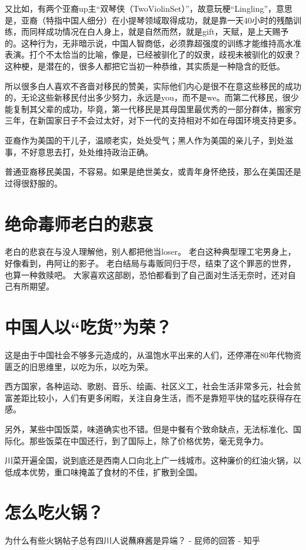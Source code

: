 \documentclass[fontset=founder]{ctexbook}
\begin{document}
又比如，有两个亚裔up主“双琴侠（TwoViolinSet）”，故意玩梗“Lingling”，意思是，亚裔（特指中国人细分）在小提琴领域取得成功，就是靠一天40小时的残酷训练，而同样成功情况在白人身上，就是自然而然，就是gift，天赋，是上天赐予的。这种行为，无非暗示说，中国人智商低，必须靠超强度的训练才能维持高水准表演。打个不太恰当的比喻，像是，已经被驯化了的奴隶，歧视未被驯化的奴隶？这种梗，是潜在的，很多人都把它当初一种恭维，其实质是一种隐含的贬低。

所以很多白人喜欢不吝啬对移民的赞美，实际他们内心是很不在意这些移民的成功的，无论这些新移民付出多少努力，永远是you，而不是we。而第二代移民，很少能复制其父辈的成功，毕竟，第一代移民是其母国里最优秀的一部分群体，搬家穷三年，在新国家日子不会过太好，对下一代的支持相对不如在母国环境支持更多。

亚裔作为美国的干儿子，温顺老实，处处受气；黑人作为美国的亲儿子，到处滋事，不好意思去打，处处维持政治正确。

普通亚裔移民美国，不容易。如果是绝世美女，或青年身怀绝技，那么在美国还是过得很舒服的。

\section{绝命毒师老白的悲哀}
老白的悲哀在与没人理解他，别人都把他当loser。
老白这种典型理工宅男身上，好像看到，冉阿让的影子。
老白结局与毒贩同归于尽，结束了这个罪恶的世界，也算一种救赎吧。
大家喜欢这部剧，恐怕都看到了自己面对生活无奈时，还对自己有所期望。

\section{中国人以“吃货”为荣？}
这是由于中国社会不够多元造成的，从温饱水平出来的人们，还停滞在80年代物资匮乏的旧思维里，以吃为乐，以吃为荣。

西方国家，各种运动、歌剧、音乐、绘画、社区义工，社会生活非常多元，社会贫富差距比较小，人们有更多闲暇，关注自身生活，而不是靠短平快的猛吃获得存在感。

另外，某些中国饭菜，味道确实也不错。但是中餐有个致命缺点，无法标准化、国际化。那些饭菜在中国还行，到了国际上，除了价格优势，毫无竞争力。

川菜开遍全国，说到底还是西南人口向北上广一线城市。这种廉价的红油火锅，以低成本优势，重口味掩盖了食材的不佳，扩散到全国。

\section{怎么吃火锅？}
为什么有些火锅帖子总有四川人说蘸麻酱是异端？ - 屁师的回答 - 知乎
\end{document}
